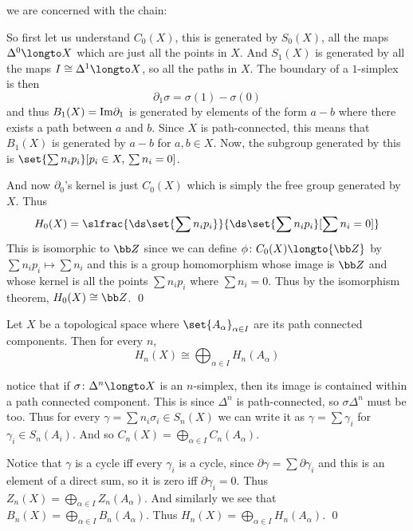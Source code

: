 \Proof we are concerned with the chain:

\bigskip
\centerline{}
\bigskip

So first let us understand $C_0(X)$, this is generated by $S_0(X)$, all the maps $\Delta^0\longto X$ which are just all the points in $X$.
And $S_1(X)$ is generated by all the maps $I\cong\Delta^1\longto X$, so all the paths in $X$.
The boundary of a $1$-simplex is then
$$ \partial_1\sigma = \sigma(1) - \sigma(0) $$
and thus $B_1(X)={\rm Im}\partial_1$ is generated by elements of the form $a-b$ where there exists a path between $a$ and $b$.
Since $X$ is path-connected, this means that $B_1(X)$ is generated by $a-b$ for $a,b\in X$.
Now, the subgroup generated by this is $\set{\sum n_ip_i}[p_i\in X,\,\sum n_i=0]$.

And now $\partial_0$'s kernel is just $C_0(X)$ which is simply the free group generated by $X$.
Thus
$$ H_0(X) = \slfrac{\ds\set{\sum n_ip_i}}{\ds\set{\sum n_ip_i}[\sum n_i=0]} $$
This is isomorphic to ${\bb Z}$ since we can define $\phi\colon C_0(X)\longto{\bb Z}$ by $\sum n_ip_i\mapsto\sum n_i$ and this is a group homomorphism whose image is ${\bb Z}$ and whose kernel is all the
points $\sum n_ip_i$ where $\sum n_i=0$.
Thus by the isomorphism theorem, $H_0(X)\cong{\bb Z}$.
\qed

\bthrm

    Let $X$ be a topological space where $\set{A_\alpha}_{\alpha\in I}$ are its path connected components.
    Then for every $n$,
    $$ H_n(X) \cong \bigoplus_{\alpha\in I}H_n(A_\alpha) $$

\ethrm

\Proof notice that if $\sigma\colon\Delta^n\longto X$ is an $n$-simplex, then its image is contained within a path connected component.
This is since $\Delta^n$ is path-connected, so $\sigma\Delta^n$ must be too.
Thus for every $\gamma=\sum n_i\sigma_i\in S_n(X)$ we can write it as $\gamma=\sum\gamma_i$ for $\gamma_i\in S_n(A_i)$.
And so $C_n(X)=\bigoplus_{\alpha\in I}C_n(A_\alpha)$.

Notice that $\gamma$ is a cycle iff every $\gamma_i$ is a cycle, since $\partial\gamma=\sum\partial\gamma_i$ and this is an element of a direct sum, so it is zero iff $\partial\gamma_i=0$.
Thus $Z_n(X)=\bigoplus_{\alpha\in I}Z_n(A_\alpha)$.
And similarly we see that $B_n(X)=\bigoplus_{\alpha\in I}B_n(A_\alpha)$.
Thus $H_n(X)=\bigoplus_{\alpha\in I}H_n(A_\alpha)$.
\qed

